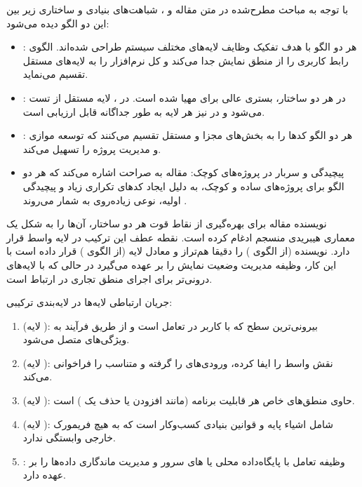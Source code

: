 با توجه به مباحث مطرح‌شده در متن مقاله و ، شباهت‌های بنیادی و ساختاری زیر بین این دو الگو دیده می‌شود:

\begin{itemize}
    \item {:} هر دو الگو با هدف تفکیک وظایف لایه‌های مختلف سیستم طراحی شده‌اند. الگوی  رابط کاربری را از منطق نمایش جدا می‌کند و  کل نرم‌افزار را به لایه‌های مستقل تقسیم می‌نماید.
    \item { :} در هر دو ساختار، بستری عالی برای  مهیا شده است. در ، لایه  مستقل از  تست می‌شود و در  نیز هر لایه به طور جداگانه قابل ارزیابی است.
    \item { :} هر دو الگو کدها را به بخش‌های مجزا و مستقل تقسیم می‌کنند که توسعه موازی و مدیریت پروژه را تسهیل می‌کند.
    \item {پیچیدگی و سربار در پروژه‌های کوچک:} مقاله به صراحت اشاره می‌کند که هر دو الگو برای پروژه‌های ساده و کوچک، به دلیل ایجاد کدهای تکراری زیاد و پیچیدگی اولیه، نوعی زیاده‌روی به شمار می‌روند .
\end{itemize}

نویسنده مقاله برای بهره‌گیری از نقاط قوت هر دو ساختار، آن‌ها را به شکل یک معماری هیبریدی منسجم ادغام کرده است. نقطه عطف این ترکیب در لایه واسط قرار دارد.
نویسنده  (از الگوی ) را دقیقا هم‌تراز و معادل لایه  (از الگوی ) قرار داده است با این کار،  وظیفه مدیریت وضعیت نمایش را بر عهده می‌گیرد در حالی که با لایه‌های درونی‌تر برای اجرای منطق تجاری در ارتباط است.

{جریان ارتباطی لایه‌ها در لایه‌بندی ترکیبی:}
\begin{enumerate}
    \item { (لایه ):} بیرونی‌ترین سطح که با کاربر در تعامل است و از طریق فرآیند  به ویژگی‌های  متصل می‌شود.
    \item { (لایه ):} نقش واسط را ایفا کرده، ورودی‌های  را گرفته و  متناسب را فراخوانی می‌کند.
    \item { (لایه ):} حاوی منطق‌های خاص هر قابلیت برنامه (مانند افزودن یا حذف یک ) است.
    \item { (لایه ):} شامل اشیاء پایه و قوانین بنیادی کسب‌وکار است که به هیچ فریمورک خارجی وابستگی ندارد.
    \item {:} وظیفه تعامل با پایگاه‌داده محلی یا های سرور و مدیریت ماندگاری داده‌ها را بر عهده دارد.
\end{enumerate}

